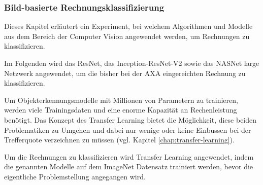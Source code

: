 \subsubsection{Bild-basierte Rechnungsklassifizierung}
\label{chap:image-recon}


Dieses Kapitel erläutert ein Experiment, bei welchem Algorithmen und Modelle aus dem Bereich der Computer Vision angewendet werden, um Rechnungen zu klassifizieren.







Im Folgenden wird das ResNet, das Inception-ResNet-V2 sowie das NASNet large Netzwerk angewendet, um die bisher bei der AXA eingereichten Rechnung zu klassifizieren.

Um Objekterkennungsmodelle mit Millionen von Parametern zu trainieren, werden viele Trainingsdaten und eine enorme Kapazität an Rechenleistung benötigt. Das Konzept des Transfer Learning bietet die Möglichkeit, diese beiden Problematiken zu Umgehen und dabei nur wenige oder keine Einbussen bei der Trefferquote verzeichnen zu müssen (vgl. Kapitel \ref{chap:transfer-learning}). %

Um die Rechnungen zu klassifizieren wird Transfer Learning angewendet, indem die genannten Modelle auf dem ImageNet Datensatz trainiert werden, bevor die eigentliche Problemstellung angegangen wird.

